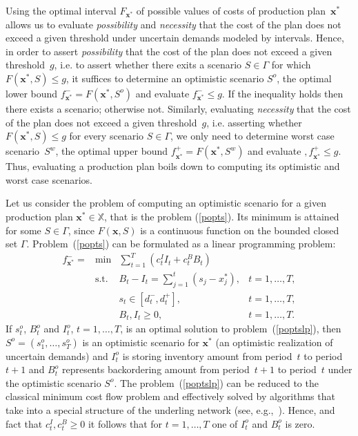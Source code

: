 \documentclass[11pt]{article}
\newcommand{\Xset}{\mathbb{X}}
\begin{document}
Using the optimal interval $F_{\pmb{x}^{*}}$ of possible values of costs of
production plan~$\pmb{x}^{*}$ 
allows us to evaluate  \emph{possibility} and \emph{necessity} that the cost of 
the plan does not exceed a given threshold under uncertain demands modeled by 
intervals. Hence,
in order to assert \emph{possibility}
 that the cost of 
the plan does not exceed a given threshold~$g$, i.e. to assert whether there exits a scenario $S\in \Gamma$ for which $F(\pmb{x}^{*},S)\leq g$,
it suffices to determine an optimistic scenario $S^{o}$, the optimal
lower bound $f_{\pmb{x}^{*}}^{-}=F(\pmb{x}^{*},S^{o})$ and
evaluate $f_{\pmb{x}^{*}}^{-}\leq g$. If the inequality holds then there exists a scenario;
otherwise not. Similarly,  evaluating
 \emph{necessity} that the cost of 
the plan does not exceed a given threshold~$g$,
i.e. asserting  whether  $F(\pmb{x}^{*},S)\leq g$
for every scenario $S\in \Gamma$,
we only need to determine worst 
case scenario~$S^{w}$,
the optimal
upper bound $f_{\pmb{x}^{*}}^{+}=F(\pmb{x}^{*},S^{w})$
and
evaluate $,f_{\pmb{x}^{*}}^{+}\leq g$. 
Thus, evaluating a production plan boils down to computing its optimistic and worst case
scenarios.

Let us consider the problem of computing an optimistic 
scenario for a given production plan $\pmb{x}^{*}\in \Xset$, that
is the problem (\ref{popts}).
Its minimum is attained for some $S\in\Gamma$,
since $F(\pmb{x},S)$ is a continuous function on the bounded closed set $\Gamma$.
Problem~(\ref{popts}) 
can be formulated as a linear programming problem:
\begin{equation}
 \begin{array}{llll}
 f_{\pmb{x}^{*}}^{-}=&\min &\sum_{t=1}^{T}(c^I_t I_t+ c^B_t B_t)&\\
&\text{s.t. } & B_t- I_t=\sum_{j=1}^{t}(s_j-x^{*}_j), & t=1,\ldots,T,\\
  &     &s_t\in [d^{-}_t,d^{+}_t],  &t=1,\ldots,T,\\
    &   &B_t,I_t\geq 0,  &t=1,\ldots,T.
 \end{array}
 \label{poptslp}
\end{equation}
If $s^{o}_t$, $B^{o}_t$ and $I^{o}_t$, $t=1,\ldots,T$,
 is an optimal solution to problem~(\ref{poptslp}), then
$S^{o}=(s^{o}_1,\ldots,s^{o}_T)$ is an optimistic scenario for $\pmb{x}^{*}$ 
(an optimistic realization of uncertain demands)
and 
$I^{o}_t$  is storing inventory amount
from period~$t$ to period~$t+1$ and 
$B^{o}_t$ represents backordering amount from period~$t+1$ to
period~$t$ under the optimistic scenario $S^{o}$.
The problem~(\ref{poptslp}) can be reduced to the classical minimum
cost flow problem and effectively solved by algorithms that take into 
a special structure of the underling network (see, e.g.,~\cite{AH08}).
Hence, and fact that $c^I_t,c^B_t\geq 0$ it follows that for $t=1,\ldots,T$
one of $I^{o}_t$ and $B^{o}_t$ is zero.
\end{document}
